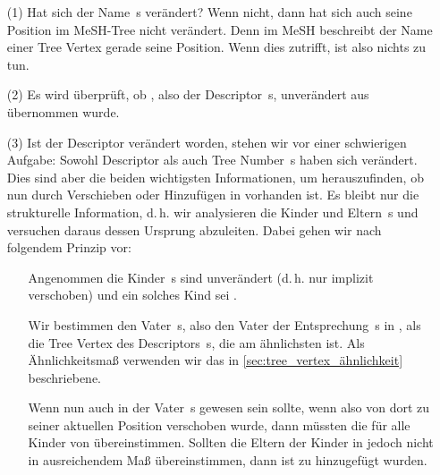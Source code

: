 
\begin{itemize}
\item[(1)] Hat sich der Name \,s verändert? Wenn nicht, dann hat sich auch seine Position im MeSH-Tree nicht verändert. Denn im MeSH beschreibt der Name einer Tree Vertex gerade seine Position. Wenn dies zutrifft, ist also nichts zu tun.

\item[(2)] Es wird überprüft, ob , also der Descriptor \,s, unverändert aus  übernommen wurde.

\item[(3)] %
Ist der Descriptor verändert worden, stehen wir vor einer schwierigen Aufgabe: Sowohl Descriptor als auch Tree Number \,s haben sich verändert. Dies sind aber die beiden wichtigsten Informationen, um herauszufinden, ob  nun durch Verschieben oder Hinzufügen in  vorhanden ist. Es bleibt nur die strukturelle Information, d.\,h. wir analysieren die Kinder und Eltern \,s und versuchen daraus dessen Ursprung abzuleiten. Dabei gehen wir nach folgendem Prinzip vor:\par

\begin{itemize}
  \item[] Angenommen die Kinder \,s sind unverändert (d.\,h. nur implizit verschoben) und ein solches Kind sei .
  \item[] Wir bestimmen den Vater \,s, also den Vater der Entsprechung \,s in , als die Tree Vertex des Descriptors \,s, die  am ähnlichsten ist. Als Ähnlichkeitsmaß verwenden wir das in \ref{sec:tree_vertex_ähnlichkeit} \textit{} beschriebene. %
  \item[] Wenn nun  auch in  der Vater \,s gewesen sein sollte, wenn  also von dort zu seiner aktuellen Position verschoben wurde, dann müssten die  für alle Kinder  von  übereinstimmen. Sollten die Eltern der Kinder in  jedoch nicht in ausreichendem Maß übereinstimmen, dann ist  zu  hinzugefügt wurden.
\end{itemize}


\end{itemize}
